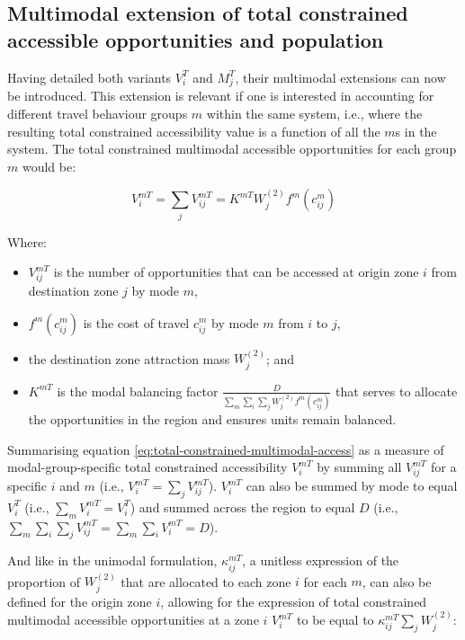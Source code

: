 \documentclass[
11pt, %
oneside, %
english, %
singlespacing, %
]{macthesis} %
\def\tightlist{}
\begin{document}
\subsection{Multimodal extension of total constrained accessible opportunities and population}\label{multimodal-extension-of-total-constrained-accessible-opportunities-and-population}

Having detailed both variants \(V_i^T\) and \(M_j^T\), their multimodal extensions can now be introduced. This extension is relevant if one is interested in accounting for different travel behaviour groups \(m\) within the same system, i.e., where the resulting total constrained accessibility value is a function of all the \(m\)s in the system. The total constrained multimodal accessible opportunities for each group \(m\) would be:

\begin{equation}
\label{eq:total-constrained-multimodal-access}
V^{mT}_{i} = \sum_j V^{mT}_{ij} = K^{mT} W_j^{(2)} f^m(c^m_{ij})
\end{equation} 

Where:

\begin{itemize}
\tightlist
\item
  \(V^{mT}_{ij}\) is the number of opportunities that can be accessed at origin zone \(i\) from destination zone \(j\) by mode \(m\),
\item
  \(f^m(c^m_{ij})\) is the cost of travel \(c^m_{ij}\) by mode \(m\) from \(i\) to \(j\),
\item
  the destination zone attraction mass \(W_j^{(2)}\); and
\item
  \(K^{mT}\) is the modal balancing factor \(\frac{D}{\sum_m\sum_i\sum_j W^{(2)}_jf^m(c^m_{ij})}\) that serves to allocate the opportunities in the region and ensures units remain balanced.
\end{itemize}

Summarising equation \ref{eq:total-constrained-multimodal-access} as a measure of modal-group-specific total constrained accessibility \(V^{mT}_i\) by summing all \(V^{mT}_{ij}\) for a specific \(i\) and \(m\) (i.e., \(V^{mT}_i = \sum_j V^{mT}_{ij}\)). \(V^{mT}_i\) can also be summed by mode to equal \(V^{T}_i\) (i.e., \(\sum_m V^{mT}_i = V^{T}_i\)) and summed across the region to equal \(D\) (i.e., \(\sum_m\sum_i\sum_j V^{mT}_{ij} = \sum_m\sum_i V^{mT}_{i} = D\)).

And like in the unimodal formulation, \(\kappa_{ij}^{mT}\), a unitless expression of the proportion of \(W^{(2)}_j\) that are allocated to each zone \(i\) for each \(m\), can also be defined for the origin zone \(i\), allowing for the expression of total constrained multimodal accessible opportunities at a zone \(i\) \(V^{mT}_i\) to be equal to \(\kappa_{ij}^{mT}\sum_j W^{(2)}_j\):
\end{document}
